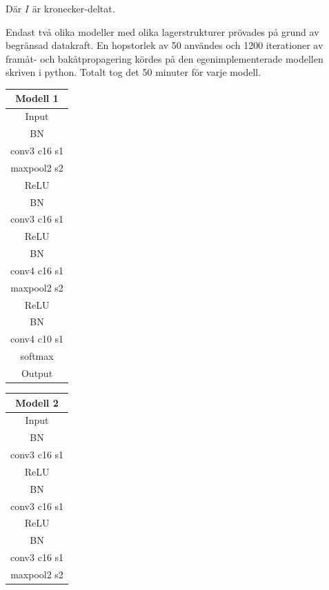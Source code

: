 \documentclass[a4paper,11pt,twoside]{article}
\begin{document}
Där $I$ är kronecker-deltat.

Endast två olika modeller med olika lagerstrukturer prövades på grund av begränsad datakraft. En hopstorlek av 50 användes och 1200 iterationer av framåt- och bakåtpropagering kördes på den egenimplementerade modellen skriven i python. Totalt tog det 50 minuter för varje modell.

\begin{center}
    \begin{tabular}{ | c |}
    \hline
    		\textbf{Modell 1} \\ \hline \hline
    		Input \\ \hline
    		BN \\ \hline
            conv3 c16 s1\\ \hline
            maxpool2 s2\\ \hline
            ReLU\\ \hline
            BN\\ \hline
            conv3 c16 s1\\ \hline
            ReLU\\ \hline
            BN\\ \hline
            conv4 c16 s1\\ \hline
            maxpool2 s2\\ \hline
            ReLU\\ \hline
            BN\\ \hline
            conv4 c10 s1\\ \hline
            softmax \\ \hline
            Output \\
    \hline
    \end{tabular}
	\qquad   
    \begin{tabular}{ | c |}
    \hline
    		\textbf{Modell 2} \\ \hline \hline
 			Input \\ \hline
 			BN \\ \hline
            conv3 c16 s1 \\ \hline
            ReLU \\ \hline
            BN \\ \hline
            conv3 c16 s1\\ \hline
            ReLU\\ \hline
            BN\\ \hline
            conv3 c16 s1\\ \hline
            maxpool2 s2\\ \hline

\end{tabular}
\end{center}
\end{document}
